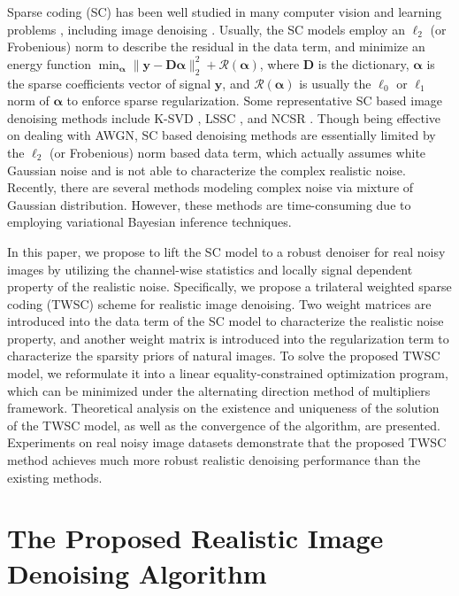 Sparse coding (SC) \cite{lasso} has been well studied in many computer vision and learning problems \cite{wright2009robust,yang2009linear,yang2010image}, including image denoising \cite{ksvd,lssc,ncsr}. Usually, the SC models employ an $\ell_{2}$ (or Frobenious) norm to describe the residual in the data term, and minimize an energy function 
$
\min_{\bm{\alpha}}
\|
\bm{y}-\bm{D}\bm{\alpha}
\|_{2}^{2}
+
\mathcal{R}(\bm{\alpha})
$, where $\bm{D}$ is the dictionary, $\bm{\alpha}$ is the sparse coefficients vector of signal $\bm{y}$, and $\mathcal{R}(\bm{\alpha})$ is usually the $\ell_{0}$ or $\ell_{1}$ norm of $\bm{\alpha}$ to enforce sparse regularization. Some representative SC based image denoising methods include K-SVD \cite{ksvd}, LSSC \cite{lssc}, and NCSR \cite{ncsr}. Though being effective on dealing with AWGN, SC based denoising methods are essentially limited by the $\ell_{2}$ (or Frobenious) norm based data term, which actually assumes white Gaussian noise and is not able to characterize the complex realistic noise. Recently, there are several methods \cite{Zhu_2016_CVPR,zhao2014robust} modeling complex noise via mixture of Gaussian distribution. However, these methods \cite{Zhu_2016_CVPR,zhao2014robust} are time-consuming due to employing variational Bayesian inference techniques.

In this paper, we propose to lift the SC model to a robust denoiser for real noisy images by utilizing the channel-wise statistics and locally signal dependent property of the realistic noise. Specifically, we propose a trilateral weighted sparse coding (TWSC) scheme for realistic image denoising. Two weight matrices are introduced into the data term of the SC model to characterize the realistic noise property, and another weight matrix is introduced into the regularization term to characterize the sparsity priors of natural images. To solve the proposed TWSC model, we reformulate it into a linear equality-constrained optimization program, which can be minimized under the alternating direction method of multipliers \cite{admm} framework. Theoretical analysis on the existence and uniqueness of the solution of the TWSC model, as well as the convergence of the algorithm, are presented. Experiments on real noisy image datasets demonstrate that the proposed TWSC method achieves much more robust realistic denoising performance than the existing methods.





\section{The Proposed Realistic Image Denoising Algorithm}

